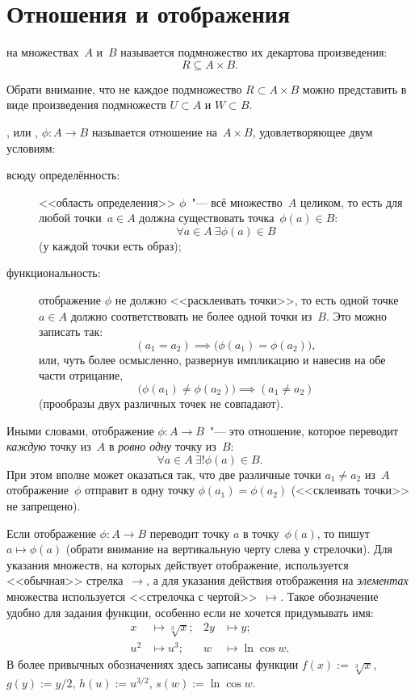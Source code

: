 \section{Отношения и отображения}
\begin{definition}
	 на множествах~$A$ и~$B$ называется подмножество их
	декартова произведения:
	\[
		R \subseteq A \times B
		.
	\]
\end{definition}

Обрати внимание, что не каждое подмножество $R \subset A \times B$ можно
представить в виде произведения подмножеств $U \subset A$ и $W \subset B$.

\begin{definition}
	, или , $\phi \colon A \to B$ называется
	отношение на~$A \times B$, удовлетворяющее двум условиям:
	\begin{description}
		\item[всюду определённость:] <<область определения>> $\phi$~"--- всё
			множество~$A$ целиком, то есть для любой точки~$a \in A$ должна
			существовать точка~$\phi(a) \in B$:
			\[
				\forall a \in A\ 
				\exists \phi(a) \in B
			\]
			(у каждой точки есть образ);
		\item[функциональность:] отображение $\phi$ не должно <<расклеивать
			точки>>, то есть одной точке $a \in A$ должно соответствовать не более
			одной точки из~$B$. Это можно записать так:
			\[
				(a_1 = a_2) \implies
				\bigl( \phi(a_1) = \phi(a_2) \bigr)
				,
			\]
			или, чуть более осмысленно, развернув импликацию и навесив на обе части
			отрицание,
			\[
				\bigl( \phi(a_1) \neq \phi(a_2) \bigr)
				\implies
				(a_1 \neq a_2)
			\]
			(прообразы двух различных точек не совпадают).
	\end{description}
\end{definition}

Иными словами, отображение $\phi \colon A \to B$~"--- это отношение, которое
переводит \emph{каждую} точку из~$A$ в \emph{ровно одну} точку из~$B$:
\[
	\forall a \in A\ 
	\exists! \phi(a) \in B
	.
\]
При этом вполне может оказаться так, что две различные точки $a_1 \neq a_2$
из~$A$ отображение~$\phi$ отправит в одну точку $\phi(a_1) = \phi(a_2)$
(<<склеивать точки>> не запрещено).

Если отображение $\phi \colon A \to B$ переводит точку $a$ в точку~$\phi(a)$,
то пишут $a \mapsto \phi(a)$ (обрати внимание на вертикальную черту слева у
стрелочки). Для указания множеств, на которых действует отображение,
используется <<обычная>> стрелка~$\to$, а для указания действия отображения на
\emph{элементах} множества используется <<стрелочка с чертой>>~$\mapsto$. Такое
обозначение удобно для задания функции, особенно если не хочется придумывать
имя:
\begin{align*}
	x &\mapsto \sqrt[3]{x};
	&
	2y &\mapsto y;
	\\
	u^2 &\mapsto u^3;
	&
	w &\mapsto \ln{\cos{w}}.
\end{align*}
В более привычных обозначениях здесь записаны функции $f(x) := \sqrt[3]{x}$,
$g(y) := y/2$, $h(u) := u^{3/2}$, $s(w) := \ln{\cos{w}}$.

